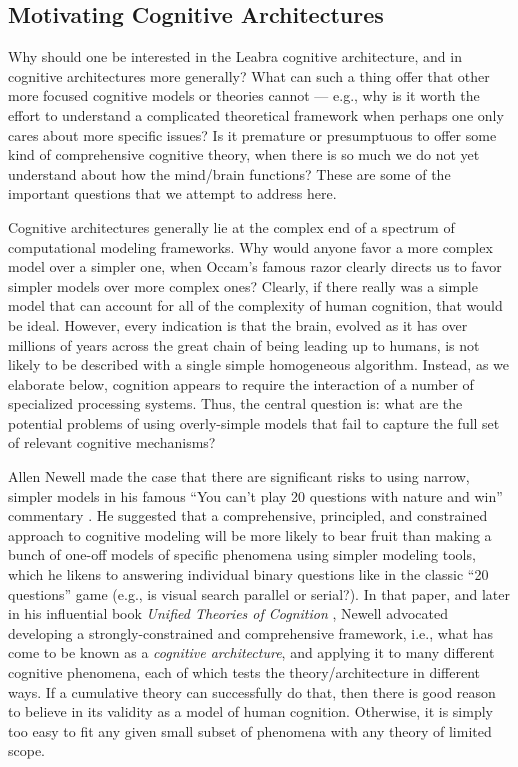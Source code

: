 \documentclass[11pt,twoside]{article}
\begin{document}
\subsection{Motivating Cognitive Architectures}

Why should one be interested in the Leabra cognitive architecture, and in
cognitive architectures more generally?  What can such a thing offer that
other more focused cognitive models or theories cannot --- e.g., why is it
worth the effort to understand a complicated theoretical framework when
perhaps one only cares about more specific issues?  Is it premature or
presumptuous to offer some kind of comprehensive cognitive theory, when there
is so much we do not yet understand about how the mind/brain functions?  These
are some of the important questions that we attempt to address here.

Cognitive architectures generally lie at the complex end of a spectrum of
computational modeling frameworks.  Why would anyone favor a more complex
model over a simpler one, when Occam's famous razor clearly directs us to
favor simpler models over more complex ones?  Clearly, if there really was a
simple model that can account for all of the complexity of human cognition,
that would be ideal.  However, every indication is that the brain, evolved as
it has over millions of years across the great chain of being leading up to
humans, is not likely to be described with a single simple homogeneous
algorithm.  Instead, as we elaborate below, cognition appears to require the
interaction of a number of specialized processing systems.  Thus, the central
question is: what are the potential problems of using overly-simple models
that fail to capture the full set of relevant cognitive mechanisms?

Allen Newell made the case that there are significant risks to using narrow,
simpler models in his famous ``You can't play 20 questions with nature and
win'' commentary \cite{Newell73}.  He suggested that a comprehensive,
principled, and constrained approach to cognitive modeling will be more likely
to bear fruit than making a bunch of one-off models of specific phenomena
using simpler modeling tools, which he likens to answering individual binary
questions like in the classic ``20 questions'' game (e.g., is visual search
parallel or serial?).  In that paper, and later in his influential book {\em
  Unified Theories of Cognition} , Newell advocated
developing a strongly-constrained and comprehensive framework, i.e., what has
come to be known as a {\em cognitive architecture}, and applying it to many
different cognitive phenomena, each of which tests the theory/architecture in
different ways.  If a cumulative theory can successfully do that, then there
is good reason to believe in its validity as a model of human cognition.
Otherwise, it is simply too easy to fit any given small subset of phenomena
with any theory of limited scope.
\end{document}
